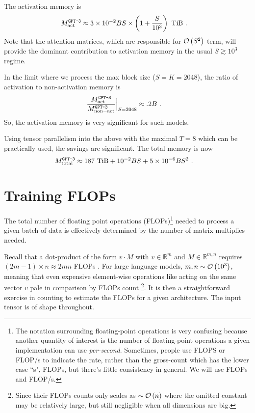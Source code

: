 \documentclass[11pt]{article}
\begin{document}
The activation memory is
\begin{align}
	M _{ {\rm act}  } ^ \texttt{GPT-3} & \approx 3 \times 10 ^{ -2 }BS\times  \left (  1  + \frac{ S
	}{ 10 ^{ 3 } } \right ) \ {\rm TiB} \ .
\end{align}
Note that the attention matrices, which are responsible for $ \mathcal{O} \left( S ^{ 2 } \right)  $ term, will
provide the dominant contribution to activation memory in the usual $ S \gtrsim 10 ^{ 3 } $ regime.

In the limit where we process the max block size ($ S=K=2048 $), the ratio of activation to
non-activation memory is
\begin{align}
	\frac{  M _{ {\rm act}  } ^ \texttt{GPT-3}}{ M _{ {\rm non-act}  } ^ \texttt{GPT-3} }\Big| _{
	S=2048 } & \approx  .2 B \ .
\end{align}
So, the activation memory is very significant for such models.


Using tensor parallelism into the above with the maximal $ T=8 $ which can be practically used, the
savings are significant. The total memory is now
\begin{align}
	M _{ {\rm total}  } ^{ \texttt{GPT-3}  } & \approx 187\ {\rm TiB} + 10 ^{ -2 }BS + 5 \times 10 ^{
			-6} BS ^{ 2 }\ .
\end{align}




\section{Training FLOPs \label{sec_flops_training} }

The total number of floating point operations (FLOPs)\footnote{The notation surrounding
	floating-point operations is very confusing because another quantity of interest is the number
	of floating-point operations a given implementation can use \textit{per-second}. Sometimes,
	people use FLOPS or FLOP/s to indicate the rate, rather than the gross-count which has the lower
	case ``s", FLOPs, but there's little consistency in general. We will use FLOPs and FLOP/s.}  needed to process a given batch of
data is effectively determined by the number of matrix multiplies needed.

Recall that a dot-product of the form $ v \cdot M $  with $ v \in \mathbb{R}^{ m } $ and $ M \in
	\mathbb{R} ^{ m, n }$ requires $ \left (2 m-1 \right )\times n \approx 2mn$ FLOPs .
For large language models, $ m,n \sim \mathcal{O} \left( 10 ^{ 3 } \right)  $, meaning that even expensive
element-wise operations like  acting on the same vector $ v $ pale in comparison by
FLOPs count \footnote{Since their FLOPs counts only scales as $ \sim \mathcal{O} \left( n\right )  $ where
	the omitted constant may be relatively large, but still negligible when all dimensions are big.}. It
is then a straightforward exercise in counting to estimate the FLOPs for a given architecture. The
input tensor is of shape  throughout.
\end{document}
